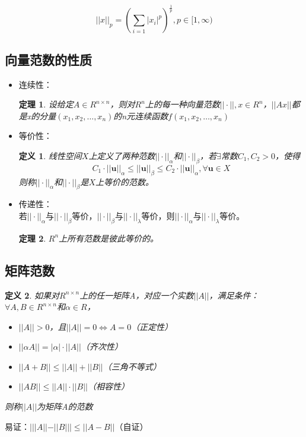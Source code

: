 \documentclass[a4paper]{article}
\newtheorem{definition}{定义}[section]
\newtheorem{theorem}{定理}[section]
\begin{document}
\begin{equation}
||x||_p = (\sum_{i=1}|x_i|^p)^{\frac{1}{p}}, p \in [1, \infty)
\end{equation}

\subsection{向量范数的性质}
\begin{itemize}
\item 连续性：
\begin{theorem}
设给定$A\in R^{n \times n}$，则对$R^n$上的每一种向量范数$||\cdot||, x\in R^n$，$||Ax||$都是x的分量$(x_1, x_2, \dots, x_n)$的n元连续函数$f(x_1, x_2, \dots, x_n)$
\label{theorem_con}
\end{theorem}
\item 等价性：
\begin{definition}
线性空间$X$上定义了两种范数$||\cdot||_\alpha$和$||\cdot||_\beta$，若$\exists$常数$C_1, C_2 > 0$，使得
$$C_1\cdot ||\mathbf{u}||_\alpha \le ||\mathbf{u}||_\beta \le C_2\cdot ||\mathbf{u}||_\alpha, \forall \mathbf{u} \in X$$
则称$||\cdot||_\alpha$和$||\cdot||_\beta$是$X$上等价的范数。
\label{def:equal}
\end{definition}
\item 传递性：\\
若$||\cdot||_\alpha$与$||\cdot||_\beta$等价，$||\cdot||_\beta$与$||\cdot||_\lambda$等价，则$||\cdot||_\alpha$与$||\cdot||_\lambda$等价。
\begin{theorem}
$R^n$上所有范数是彼此等价的。
\end{theorem}
\end{itemize}

\subsection{矩阵范数}
\begin{definition}
如果对$R^{n\times n}$上的任一矩阵A，对应一个实数$||A||$，满足条件：$\forall A,B \in R^{n\times n}$和$\alpha \in R$，
\begin{itemize}
\item $||A|| > 0$，且$||A||=0 \Leftrightarrow A=0$\hfill（正定性）
\item $||\alpha A||=|\alpha|\cdot||A||$\hfill （齐次性）
\item $||A+B|| \le ||A|| + ||B||$\hfill（三角不等式）
\item $||AB||\le ||A||\cdot||B||$\hfill （相容性）
\end{itemize}
则称$||A||$为矩阵A的范数\\
\end{definition}
易证：$|||A||-||B|||\le ||A-B||$（自证）
\end{document}
